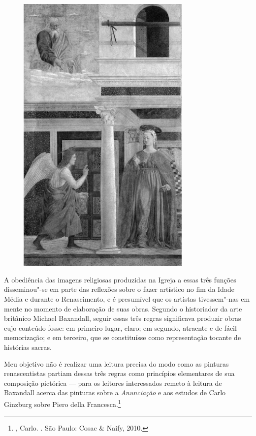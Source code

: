 \begin{figure}[!ht]
\centering
 \includegraphics[width=85mm]{./imgs/francesca.jpg}
\caption{\tiny{}}
\end{figure}

A obediência das imagens religiosas produzidas na Igreja
a essas três funções disseminou"-se em parte das reflexões
sobre o fazer artístico no fim da Idade Média e durante o Renascimento,
e é presumível que os artistas tivessem"-nas em mente no momento de
elaboração de suas obras. Segundo o historiador da arte britânico
Michael Baxandall, seguir essas três regras significava produzir obras
cujo conteúdo fosse: em primeiro lugar, claro; em segundo, atraente e de
fácil memorização; e em terceiro, que se constituísse como representação
tocante de histórias sacras.

Meu objetivo não é realizar uma leitura precisa do modo como as pinturas
renascentistas partiam dessas três regras como princípios elementares de
sua composição pictórica --- para os leitores interessados remeto à
leitura de Baxandall acerca das pinturas sobre a \emph{Anunciação} e aos
estudos de Carlo Ginzburg sobre Piero della Francesca.\footnote{,
  Carlo. {}. São Paulo: Cosac \& Naify, 2010.}

